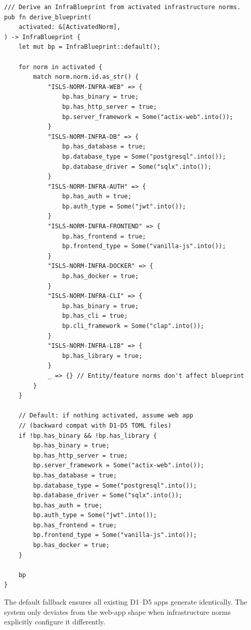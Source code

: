 \documentclass[11pt,a4paper]{article}
\begin{document}
\begin{lstlisting}[style=rust]
/// Derive an InfraBlueprint from activated infrastructure norms.
pub fn derive_blueprint(
    activated: &[ActivatedNorm],
) -> InfraBlueprint {
    let mut bp = InfraBlueprint::default();
    
    for norm in activated {
        match norm.norm.id.as_str() {
            "ISLS-NORM-INFRA-WEB" => {
                bp.has_binary = true;
                bp.has_http_server = true;
                bp.server_framework = Some("actix-web".into());
            }
            "ISLS-NORM-INFRA-DB" => {
                bp.has_database = true;
                bp.database_type = Some("postgresql".into());
                bp.database_driver = Some("sqlx".into());
            }
            "ISLS-NORM-INFRA-AUTH" => {
                bp.has_auth = true;
                bp.auth_type = Some("jwt".into());
            }
            "ISLS-NORM-INFRA-FRONTEND" => {
                bp.has_frontend = true;
                bp.frontend_type = Some("vanilla-js".into());
            }
            "ISLS-NORM-INFRA-DOCKER" => {
                bp.has_docker = true;
            }
            "ISLS-NORM-INFRA-CLI" => {
                bp.has_binary = true;
                bp.has_cli = true;
                bp.cli_framework = Some("clap".into());
            }
            "ISLS-NORM-INFRA-LIB" => {
                bp.has_library = true;
            }
            _ => {} // Entity/feature norms don't affect blueprint
        }
    }
    
    // Default: if nothing activated, assume web app
    // (backward compat with D1-D5 TOML files)
    if !bp.has_binary && !bp.has_library {
        bp.has_binary = true;
        bp.has_http_server = true;
        bp.server_framework = Some("actix-web".into());
        bp.has_database = true;
        bp.database_type = Some("postgresql".into());
        bp.database_driver = Some("sqlx".into());
        bp.has_auth = true;
        bp.auth_type = Some("jwt".into());
        bp.has_frontend = true;
        bp.frontend_type = Some("vanilla-js".into());
        bp.has_docker = true;
    }
    
    bp
}
\end{lstlisting}

The default fallback ensures all existing D1--D5 apps generate 
identically. The system only deviates from the web-app shape when 
infrastructure norms explicitly configure it differently.


\end{document}
